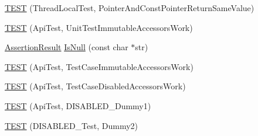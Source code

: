 \begin{DoxyCompactItemize}
\hyperlink{namespacetesting_1_1internal_aaed45d6ba960f02e8d3d042c606bc98e}{T\+E\+ST} (Thread\+Local\+Test, Pointer\+And\+Const\+Pointer\+Return\+Same\+Value)
\item 
\hyperlink{namespacetesting_1_1internal_a9ac879683abb06d1c0bba3a339ea2f40}{T\+E\+ST} (Api\+Test, Unit\+Test\+Immutable\+Accessors\+Work)
\item 
\hyperlink{classtesting_1_1AssertionResult}{Assertion\+Result} \hyperlink{namespacetesting_1_1internal_adcfd37a66bc4cb0e8291cf46e1a6c72b}{Is\+Null} (const char $\ast$str)
\item 
\hyperlink{namespacetesting_1_1internal_a33809333fe5b5f33c2bd56ddcdd1dbb6}{T\+E\+ST} (Api\+Test, Test\+Case\+Immutable\+Accessors\+Work)
\item 
\hyperlink{namespacetesting_1_1internal_a459d693357db8f8f48c26a8bee3ffb84}{T\+E\+ST} (Api\+Test, Test\+Case\+Disabled\+Accessors\+Work)
\item 
\hyperlink{namespacetesting_1_1internal_a9ed5f89c92532506899e3908e79af4de}{T\+E\+ST} (Api\+Test, D\+I\+S\+A\+B\+L\+E\+D\+\_\+\+Dummy1)
\item 
\hyperlink{namespacetesting_1_1internal_a4a84433419426d1c1b87ce998267b0d4}{T\+E\+ST} (D\+I\+S\+A\+B\+L\+E\+D\+\_\+\+Test, Dummy2)
\end{DoxyCompactItemize}
